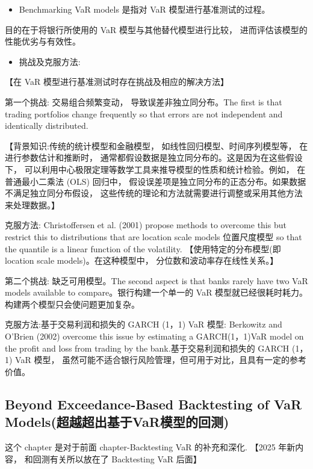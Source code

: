 \begin{itemize}
\item Benchmarking VaR models 是指对 VaR 模型进行基准测试的过程。
\end{itemize}

 目的在于将银行所使用的 VaR 模型与其他替代模型进行比较， 进而评估该模型的性能优劣与有效性。

\begin{itemize}
\item 挑战及克服方法:
\end{itemize}

【在 VaR 模型进行基准测试时存在挑战及相应的解决方法】

 第一个挑战: 交易组合频繁变动， 导致误差非独立同分布。The first is that trading portfolios change frequently so that errors are not independent and identically distributed.

【背景知识:传统的统计模型和金融模型， 如线性回归模型、时间序列模型等， 在进行参数估计和推断时， 通常都假设数据是独立同分布的。这是因为在这些假设下， 可以利用中心极限定理等数学工具来推导模型的性质和统计检验。例如， 在普通最小二乘法 (OLS) 回归中， 假设误差项是独立同分布的正态分布。如果数据不满足独立同分布假设， 这些传统的理论和方法就需要进行调整或采用其他方法来处理数据。】

克服方法: Christoffersen et al. (2001) propose methods to overcome this but restrict this to distributions that are location scale models 位置尺度模型 so that the quantile is a linear function of the volatility. 【使用特定的分布模型(即 location scale models)。在这种模型中， 分位数和波动率存在线性关系。】

 第二个挑战: 缺乏可用模型。The second aspect is that banks rarely have two VaR models available to compare。银行构建一个单一的 VaR 模型就已经很耗时耗力。构建两个模型只会使问题更加复杂。

克服方法:基于交易利润和损失的 GARCH (1，1) VaR 模型: Berkowitz and O'Brien (2002) overcome this issue by estimating a GARCH(1，1)VaR model on the profit and loss from trading by the bank.基于交易利润和损失的 GARCH (1，1) VaR 模型， 虽然可能不适合银行风险管理，但可用于对比，且具有一定的参考价值。


\subsection{Beyond Exceedance-Based Backtesting of VaR Models(超越超出基于VaR模型的回测)}    


这个 chapter 是对于前面 chapter-Backtesting VaR 的补充和深化. 【2025 年新内容， 和回测有关所以放在了 Backtesting VaR 后面】

